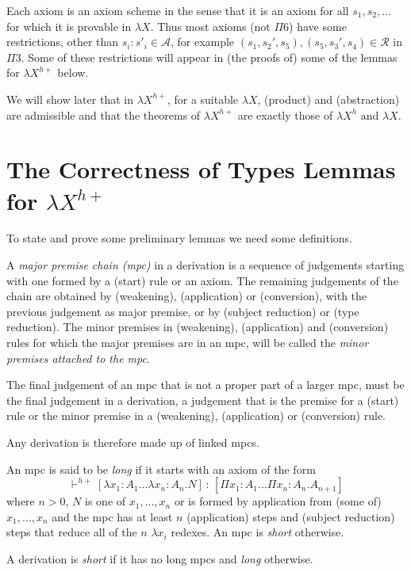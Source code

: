 \documentclass{LMCS}
\def\:{\mathbin{\,:\,}}
\begin{document}
  Each axiom is an axiom scheme in the sense that it is an axiom for
  all $s_1,s_2,\dots $ for which it is provable in $\lambda X$. Thus most
  axioms (not $\Pi$6) have some restrictions, other than $s_i:s'_i\in
 \mathcal A$, for example $(s_1,s_2',s_5), (s_5,s_3',s_4)\in
 \mathcal R$ in $\Pi 3$. Some of these restrictions will appear in
  (the proofs of) some of the lemmas for $\lambda X^{h+}$ below.

  We will show later that in $\lambda X^{h +}$, for a suitable
  $\lambda X$, (product) and (abstraction) are admissible and that the
  theorems of $\lambda X^{h +}$ are exactly those of $\lambda X^h$ and
  $\lambda X$.

\section{The Correctness of Types Lemmas for \texorpdfstring{$\lambda
    X^{h +}$}{lambda X{h+}}}\label{S:CTL}

 \noindent To state and prove some preliminary lemmas we need some
  definitions.

\begin{defi}\label{D:mpc}
  A \emph{major premise chain (mpc)} in a derivation is a sequence of
  judgements starting with one formed by a (start) rule or an
  axiom. The remaining judgements of the chain are obtained by
  (weakening), (application) or (conversion), with the previous
  judgement as major premise, or by (subject reduction) or (type
  reduction). The minor premises in (weakening), (application) and
  (conversion) rules for which the major premises are in an mpc, will
  be called the \emph{minor premises attached to the mpc}.
\end{defi}

  The final judgement of an mpc that is not a proper part of a larger
  mpc, must be the final judgement in a derivation, a judgement that
  is the premise for a (start) rule or the minor premise in a
  (weakening), (application) or (conversion) rule.

  Any derivation is therefore made up of linked mpcs.


\begin{defi}\label{D:losh}
   An mpc is said to be \emph{long} if it starts with an axiom of the form
\begin{equation}\label{EQ:eighteen}
 \vdash^{h+}[\lambda x_1{:}A_1\dots\lambda x_n{:}A_n.N]\:
  [\Pi x_1{:}A_1\dots\Pi x_n{:}A_n.A_{n+1}]
\end{equation}
  where $n> 0$, $N$ is one of $x_1,\dots ,x_n$ or is formed by
  application from (some of) $x_1,\dots ,x_n$ and the mpc has at least
  $n$ (application) steps and (subject reduction) steps that reduce
  all of the $n$ $\lambda x_i$ redexes. An mpc is \emph{short}
  otherwise.

  A derivation is \emph{short} if it has no long mpcs and \emph{long}
  otherwise.
\end{defi}
\end{document}

